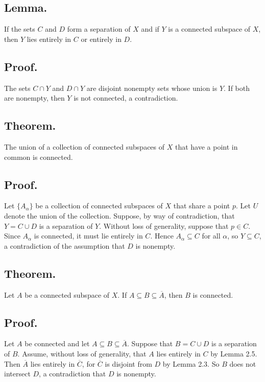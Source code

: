 \documentclass[titlepage]{article}
\begin{document}
\subsection{Lemma.} If the sets $C$ and $D$ form a separation of $X$ and if $Y$ is a connected subspace of $X$, then $Y$ lies entirely in $C$ or entirely in $D$.

\subsection{Proof.} The sets $C \cap Y$ and $D \cap Y$ are disjoint nonempty sets whose union is $Y$. If both are nonempty, then $Y$ is not connected, a contradiction.

\subsection{Theorem.} The union of a collection of connected subspaces of $X$ that have a point in common is connected.

\subsection{Proof.} Let $\{A_{\alpha}\}$ be a collection of connected subspaces of $X$ that share a point $p$. Let $U$ denote the union of the collection. Suppose, by way of contradiction, that $Y = C \cup D$ is a separation of $Y$. Without loss of generality, suppose that $p \in C$. Since $A_{\alpha}$ is connected, it must lie entirely in $C$. Hence $A_{\alpha} \subseteq C$ for all $\alpha$, so $Y \subseteq C$, a contradiction of the assumption that $D$ is nonempty.

\subsection{Theorem.} Let $A$ be a connected subspace of $X$. If $A \subseteq B \subseteq \overline{A}$, then $B$ is connected.

\subsection{Proof.} Let $A$ be connected and let $A \subseteq B \subseteq \overline{A}$. Suppose that $B = C \cup D$ is a separation of $B$. Assume, without loss of generality, that $A$ lies entirely in $C$ by Lemma 2.5. Then $\overline{A}$ lies entirely in $\overline{C}$, for $\overline{C}$ is disjoint from $D$ by Lemma 2.3. So $B$ does not intersect $D$, a contradiction that $D$ is nonempty.
\end{document}
